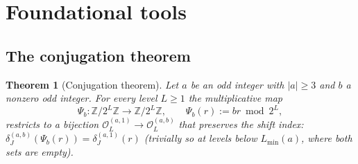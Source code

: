 \documentclass[11pt,reqno]{amsart}
\theoremstyle{plain}
\newtheorem{theorem}{Theorem}[section]
\theoremstyle{definition}
\theoremstyle{remark}
\newcommand{\Z}{\mathbb{Z}}
\newcommand{\Obs}{\mathcal{O}}
\newcommand{\Psib}{\Psi_{b}}
\newcommand{\Obsab}{\Obs_{L}^{(a,b)}}
\begin{document}
\section{Foundational tools}\label{sec:tools}

\subsection{The conjugation theorem}

\begin{theorem}[Conjugation theorem]\label{thm:conjugation}
Let $a$ be an odd integer with $\lvert a \rvert \ge 3$ and $b$ a nonzero
odd integer. For every level $L \ge 1$ the multiplicative map
\[
\Psib : \Z/2^L\Z \to \Z/2^L\Z, \qquad \Psib(r) := b r \bmod 2^L,
\]
restricts to a bijection $\Obs_L^{(a,1)} \to \Obsab$ that preserves the
shift index: $\delta_J^{(a,b)}(\Psib(r)) = \delta_J^{(a,1)}(r)$ (trivially
so at levels below $L_{\min}(a)$, where both sets are empty).
\end{theorem}
\end{document}
